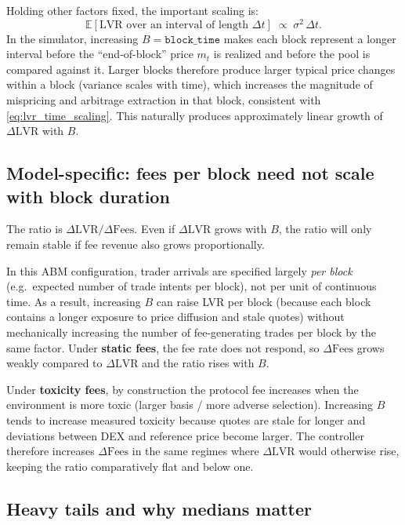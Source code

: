 \documentclass[11pt]{article}
\begin{document}
Holding other factors fixed, the important scaling is:
\begin{equation}
  \mathbb{E}[\mathrm{LVR} \text{ over an interval of length } \Delta t]
  \;\propto\;
  \sigma^2 \,\Delta t.
  \label{eq:lvr_time_scaling}
\end{equation}
In the simulator, increasing $B=\texttt{block\_time}$ makes each block represent a longer interval before the ``end-of-block'' price
$m_t$ is realized and before the pool is compared against it. Larger blocks therefore produce larger typical price changes within
a block (variance scales with time), which increases the magnitude of mispricing and arbitrage extraction in that block, consistent
with \eqref{eq:lvr_time_scaling}. This naturally produces approximately linear growth of $\Delta\mathrm{LVR}$ with $B$.

\subsection{Model-specific: fees per block need not scale with block duration}

The ratio is $\Delta\mathrm{LVR}/\Delta\mathrm{Fees}$. Even if $\Delta\mathrm{LVR}$ grows with $B$, the ratio will only remain stable if
fee revenue also grows proportionally.

In this ABM configuration, trader arrivals are specified largely \emph{per block} (e.g.\ expected number of trade intents per block),
not per unit of continuous time. As a result, increasing $B$ can raise LVR per block (because each block contains a longer exposure
to price diffusion and stale quotes) without mechanically increasing the number of fee-generating trades per block by the same factor.
Under \textbf{static fees}, the fee rate does not respond, so $\Delta\mathrm{Fees}$ grows weakly compared to $\Delta\mathrm{LVR}$ and the
ratio rises with $B$.

Under \textbf{toxicity fees}, by construction the protocol fee increases when the environment is more toxic (larger basis / more
adverse selection). Increasing $B$ tends to increase measured toxicity because quotes are stale for longer and deviations between DEX
and reference price become larger. The controller therefore increases $\Delta\mathrm{Fees}$ in the same regimes where $\Delta\mathrm{LVR}$
would otherwise rise, keeping the ratio comparatively flat and below one.

\subsection{Heavy tails and why medians matter}
\end{document}
